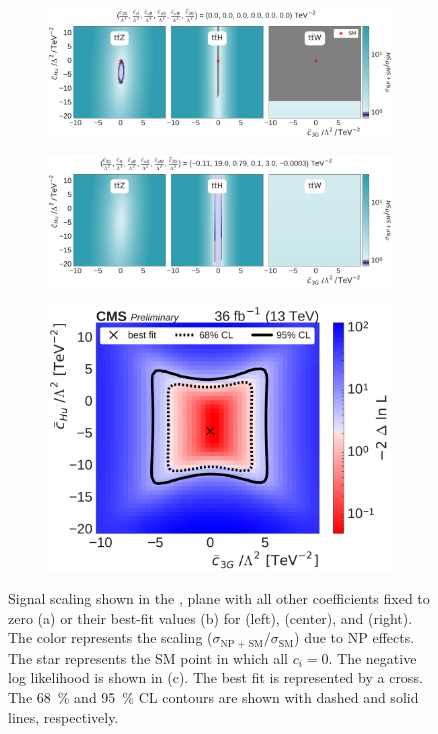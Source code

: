 \begin{figure}
  \vspace{-1cm}
  \begin{subfigure}{\linewidth}
    \centering
    \includegraphics[width=\linewidth]{figures/thirteen-TeV/scaling-frozen/c3G_cHu}
    \caption{}
  \end{subfigure}
  \begin{subfigure}{\linewidth}
    \centering
    \includegraphics[width=\linewidth]{figures/thirteen-TeV/scaling/c3G_cHu}
    \caption{}
  \end{subfigure}
  \begin{subfigure}{\linewidth}
    \centering
    \includegraphics[width=0.6\linewidth]{figures/thirteen-TeV/nll/c3G_cHu}
    \caption{}
  \end{subfigure}
  \vspace{-1cm}
  \setlength{\capwidth}{15cm}
  \caption[Signal scaling and profile likelihood scan in the \cHu, \cthreeG plane]{Signal scaling
  shown in the \cHu, \cthreeG plane with all other coefficients fixed to zero (a) or their best-fit
  values (b) for \ttZ (left), \ttH (center), and \ttW (right). The color represents the scaling
  ($\sigma_\text{NP + SM} / \sigma_\text{SM}$) due to NP effects. The star represents the SM point in
  which all $c_i=0$. The negative log likelihood is shown in (c). The best fit is represented by a
  cross. The \SI{68}{\percent} and \SI{95}{\percent} CL contours are shown with dashed and solid
  lines, respectively.}
\end{figure}

